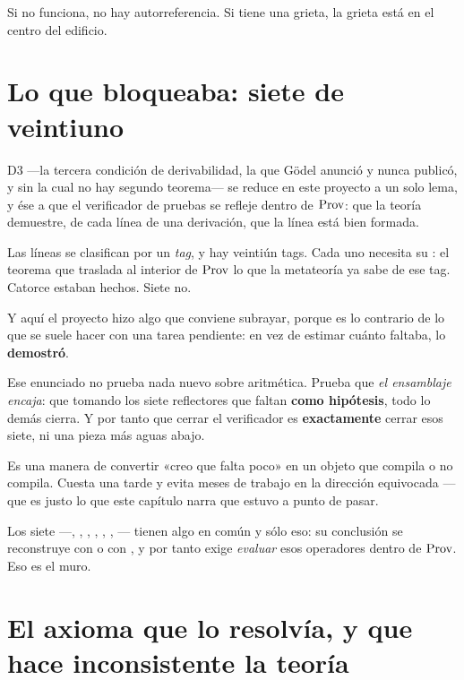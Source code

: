 
Si  no funciona, no hay autorreferencia. Si tiene una grieta, la grieta está en el
centro del edificio.

\section{Lo que bloqueaba: siete de veintiuno}

D3 —la tercera condición de derivabilidad, la que Gödel anunció y nunca publicó, y sin la cual no
hay segundo teorema— se reduce en este proyecto a un solo lema, y ése a que el verificador de
pruebas se refleje dentro de $\operatorname{Prov}$: que la teoría demuestre, de cada línea de una derivación, que
la línea está bien formada.

Las líneas se clasifican por un \emph{tag}, y hay veintiún tags. Cada uno necesita su
: el teorema que traslada al interior de $\operatorname{Prov}$ lo que la
metateoría ya sabe de ese tag. Catorce estaban hechos. Siete no.

Y aquí el proyecto hizo algo que conviene subrayar, porque es lo contrario de lo que se suele
hacer con una tarea pendiente: en vez de estimar cuánto faltaba, lo \textbf{demostró}.


\begin{leccion}
Ese enunciado no prueba nada nuevo sobre aritmética. Prueba que \emph{el ensamblaje encaja}: que
tomando los siete reflectores que faltan \textbf{como hipótesis}, todo lo demás cierra. Y por tanto
que cerrar el verificador es \textbf{exactamente} cerrar esos siete, ni una pieza más aguas abajo.

Es una manera de convertir «creo que falta poco» en un objeto que compila o no compila. Cuesta una
tarde y evita meses de trabajo en la dirección equivocada — que es justo lo que este capítulo
narra que estuvo a punto de pasar.
\end{leccion}

Los siete —, , , , , ,
— tienen algo en común y sólo eso: su conclusión se reconstruye con 
o con , y por tanto exige \emph{evaluar} esos operadores dentro de $\operatorname{Prov}$. Eso es el
muro.

\section{El axioma que lo resolvía, y que hace inconsistente la teoría}

